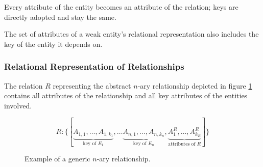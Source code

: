 Every attribute of the entity becomes an attribute of the relation; keys are directly adopted and stay the same.

\begin{note}
The set of attributes of a weak entity's relational representation also includes the key of the entity it depends on.
\end{note}




\subsubsection[Representation of Relationships]{Relational Representation of Relationships}

The relation $R$ representing the abstract $n$-ary relationship depicted in figure \ref{fig_gen_relationship} contains all attributes of the relationship and all key attributes of the entities involved.

\[
R : \{[
\underbrace{A_{1,1}, \ldots, A_{1,k_1}}_\text{key of $E_1$}, \ldots
\underbrace{A_{n,1}, \ldots, A_{n,k_n}}_\text{key of $E_n$},
\underbrace{A_1^R, \ldots, A_{k_R}^R}_\text{attributes of $R$}
]\}
\]

\begin{figure}[htbp]
\begin{center}
\end{center}
\caption[n-ary Relationship]{Example of a generic $n$-ary relationship.}
\label{fig_gen_relationship}
\end{figure}

